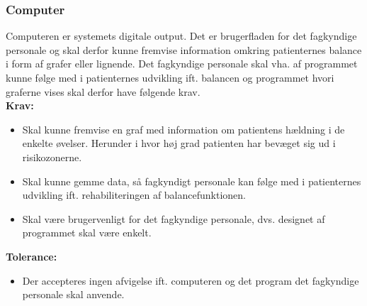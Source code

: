 \subsubsection{Computer}
Computeren er systemets digitale output. Det er brugerfladen for det fagkyndige personale og skal derfor kunne fremvise information omkring patienternes balance i form af grafer eller lignende. Det fagkyndige personale skal vha. af programmet kunne følge med i patienternes udvikling ift. balancen og programmet hvori graferne vises skal derfor have følgende krav. \\
\textbf{Krav:}
\begin{itemize}
\item Skal kunne fremvise en graf med information om patientens hældning i de enkelte øvelser. Herunder i hvor høj grad patienten har bevæget sig ud i risikozonerne. 
\item Skal kunne gemme data, så fagkyndigt personale kan følge med i patienternes udvikling ift. rehabiliteringen af balancefunktionen.
\item Skal være brugervenligt for det fagkyndige personale, dvs. designet af programmet skal være enkelt. 
\end{itemize}
\textbf{Tolerance:}
\begin{itemize}
\item Der accepteres ingen afvigelse ift. computeren og det program det fagkyndige personale skal anvende. 
\end{itemize}


